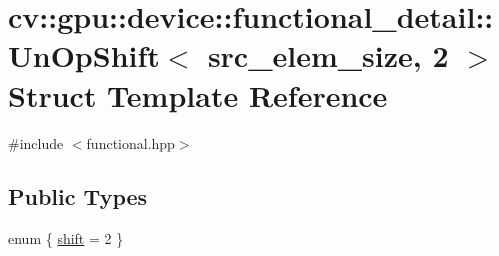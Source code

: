 \hypertarget{structcv_1_1gpu_1_1device_1_1functional__detail_1_1UnOpShift_3_01src__elem__size_00_012_01_4}{\section{cv\-:\-:gpu\-:\-:device\-:\-:functional\-\_\-detail\-:\-:Un\-Op\-Shift$<$ src\-\_\-elem\-\_\-size, 2 $>$ Struct Template Reference}
\label{structcv_1_1gpu_1_1device_1_1functional__detail_1_1UnOpShift_3_01src__elem__size_00_012_01_4}
}


{\ttfamily \#include $<$functional.\-hpp$>$}

\subsection*{Public Types}
\begin{DoxyCompactItemize}
\item 
enum \{ \hyperlink{structcv_1_1gpu_1_1device_1_1functional__detail_1_1UnOpShift_3_01src__elem__size_00_012_01_4_a0f5a1afb58543445d0295caee7ad6054aa9e996504845be45cbb3f6c06b4d8b0d}{shift} = 2
 \}
\end{DoxyCompactItemize}


